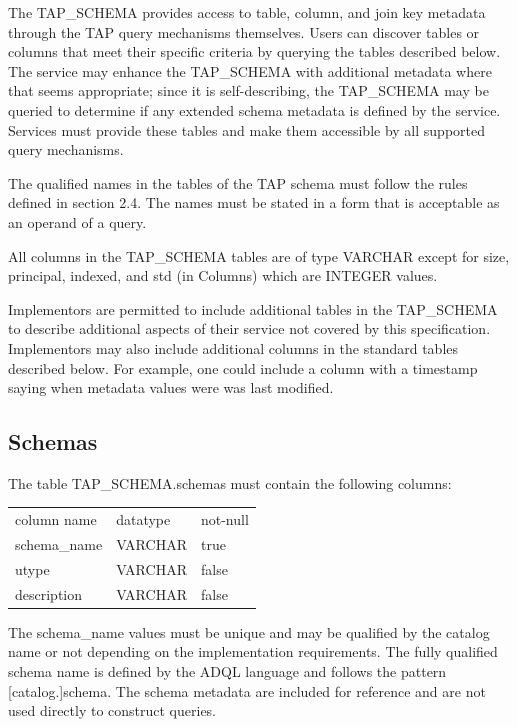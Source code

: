 \documentclass[11pt,letter]{ivoa}
\begin{document}
{The TAP\_SCHEMA provides access to table, column, and join key 
metadata through the TAP query mechanisms themselves. Users can discover tables 
or columns that meet their specific criteria by querying the tables described 
below.  The service may enhance the TAP\_SCHEMA with additional 
metadata where that seems appropriate; since it is self-describing, the 
TAP\_SCHEMA may be queried to determine if any extended schema 
metadata is defined by the service. Services must provide these tables and make 
them accessible by all supported query mechanisms.

The qualified names in the tables of the TAP schema must follow the rules 
defined in section 2.4. The names must be stated in a form that is acceptable as 
an operand of a query.

All columns in the TAP\_SCHEMA tables are of type VARCHAR except 
for size,  principal, indexed, and std (in Columns) which are INTEGER values.

Implementors are permitted to include additional tables in the 
TAP\_SCHEMA to describe additional aspects of their service not 
covered by this specification. Implementors may also include additional columns 
in the standard tables described below. For example, one could include a column 
with a timestamp saying when metadata values were was last modified.

\subsection{Schemas}
\label{sec:tap-schema-schemas}

The table TAP\_SCHEMA.schemas must contain the following columns:

\begin{tabular}{l l l}
\label{tab:resources}
column name & datatype & not-null \\
schema\_name & VARCHAR & true \\
utype & VARCHAR & false \\
description & VARCHAR & false \\
\end{tabular}

The schema\_name values must be unique and may be qualified by the 
catalog name or not depending on the implementation requirements. The fully 
qualified schema name is defined by the ADQL language and  follows the pattern 
[catalog.]schema. The schema metadata are included for reference and are not 
used directly to construct queries.

}
\end{document}

